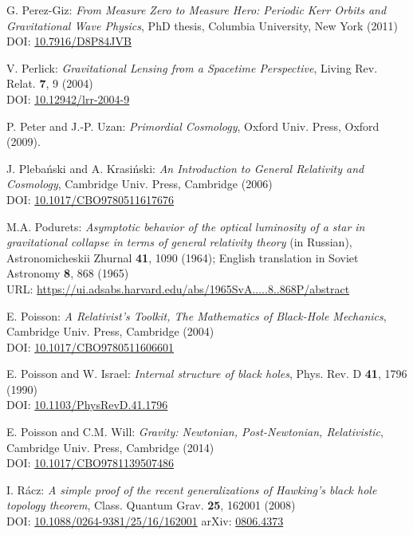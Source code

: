 \begin{thebibliography}{123}
G. Perez-Giz: {\em From Measure Zero to Measure Hero:
Periodic Kerr Orbits and Gravitational Wave Physics},
PhD thesis, Columbia University, New York (2011)\\
DOI: \href{https://doi.org/10.7916/D8P84JVB}{10.7916/D8P84JVB}

V. Perlick:
{\em Gravitational Lensing from a Spacetime Perspective},
Living Rev. Relat. {\bf 7}, 9 (2004)\\
DOI: \href{https://doi.org/10.12942/lrr-2004-9}{10.12942/lrr-2004-9}

P. Peter and J.-P. Uzan: {\em Primordial Cosmology},
Oxford Univ. Press, Oxford (2009).

J. Pleba\'nski and A. Krasi\'nski:
{\em An Introduction to General Relativity and Cosmology},
Cambridge Univ. Press, Cambridge (2006)\\
DOI: \href{https://doi.org/10.1017/CBO9780511617676}{10.1017/CBO9780511617676}

M.A. Podurets:
{\em Asymptotic behavior of the optical luminosity of a star in gravitational collapse
in terms of general relativity theory}
(in Russian),
Astronomicheskii Zhurnal {\bf 41}, 1090 (1964);
English translation in Soviet Astronomy {\bf 8}, 868 (1965)\\
URL: \url{https://ui.adsabs.harvard.edu/abs/1965SvA.....8..868P/abstract}

E. Poisson: \emph{A Relativist's Toolkit,
The Mathematics of Black-Hole Mechanics},
Cambridge Univ. Press, Cambridge (2004) \\
DOI: \href{https://doi.org/10.1017/CBO9780511606601}{10.1017/CBO9780511606601}

E. Poisson and W. Israel: {\em Internal structure of black holes},
Phys. Rev. D {\bf 41}, 1796 (1990) \\
DOI: \href{https://doi.org/10.1103/PhysRevD.41.1796}{10.1103/PhysRevD.41.1796}

E. Poisson and C.M. Will: {\em Gravity: Newtonian, Post-Newtonian, Relativistic},
Cambridge Univ. Press, Cambridge (2014) \\
DOI: \href{https://doi.org/10.1017/CBO9781139507486}{10.1017/CBO9781139507486}

I. R\'acz:
{\em A simple proof of the recent generalizations of Hawking's black hole topology theorem},
Class. Quantum Grav. {\bf 25}, 162001 (2008)\\
DOI: \href{https://doi.org/10.1088/0264-9381/25/16/162001}{10.1088/0264-9381/25/16/162001}\hfill
arXiv: \href{https://arxiv.org/abs/0806.4373}{0806.4373}


\end{thebibliography}
